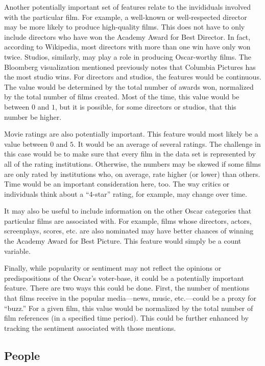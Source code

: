 \documentclass[11pt]{article}
\begin{document}
Another potentially important set of features relate to the invididuals
involved with the particular film. For example, a well-known or well-respected
director may be more likely to produce high-quality films. This does not have
to only include directors who have won the Academy Award for Best Director. In
fact, according to Wikipedia\cite{wikibestdirector}, most directors with more
than one win have only won twice. Studios, similarly, may play a role in
producing Oscar-worthy films. The Bloomberg visualization mentioned previously
notes that Columbia Pictures has the most studio wins. For directors and
studios, the features would be continuous. The value would be determined by the 
total number of awards won, normalized by the total number of films created.
Most of the time, this value would be between $0$ and $1$, but it is possible,
for some directors or studios, that this number be higher.

Movie ratings are also potentially important. This feature would most likely be
a value between $0$ and $5$. It would be an average of several ratings. The
challenge in this case would be to make sure that every film in the data set
is represented by all of the rating institutions. Otherwise, the numbers may be
skewed if some films are only rated by institutions who, on average, rate
higher (or lower) than others. Time would be an important consideration here,
too. The way critics or individuals think about a ``4-star'' rating, for
example, may change over time.

It may also be useful to include information on the other Oscar categories
that particular films are associated with. For example, films whose directors,
actors, screenplays, scores, etc. are also nominated may have better chances of
winning the Academy Award for Best Picture. This feature would simply be a
count variable.

Finally, while popularity or sentiment may not reflect the opinions or
predispositions of the Oscar's voter-base, it could be a potentially important
feature. There are two ways this could be done. First, the number of mentions
that films receive in the popular media---news, music, etc.---could be a proxy
for ``buzz.'' For a given film, this value would be normalized by the total
number of film references (in a specified time period). This could be further
enhanced by tracking the sentiment associated with those mentions.

\subsection{People}
\end{document}
